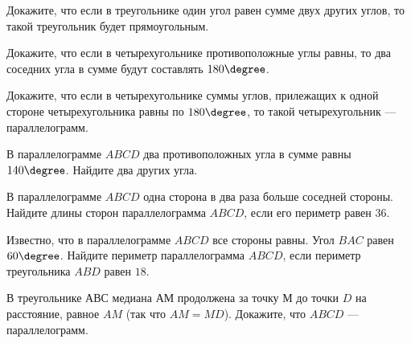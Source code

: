 \begin{class}[number=6]
	\begin{listofex}
		\item Докажите, что если в треугольнике один угол равен сумме двух других углов, то такой треугольник будет прямоугольным.
		\item Докажите, что если в четырехугольнике противоположные углы равны, то два соседних угла в сумме будут составлять \( 180\degree \).
		\item Докажите, что если в четырехугольнике суммы углов, прилежащих к одной стороне четырехугольника равны по \( 180\degree \), то такой четырехугольник --- параллелограмм.
		\item В параллелограмме \( ABCD \) два противоположных угла в сумме равны \( 140\degree \). Найдите два других угла.
		\item В параллелограмме \( ABCD \) одна сторона в два раза больше соседней стороны. Найдите длины сторон параллелограмма \( ABCD \), если его периметр равен \( 36 \).
		\item Известно, что в параллелограмме \( ABCD \) все стороны равны. Угол \( BAC \) равен \( 60\degree \). Найдите периметр параллелограмма \( ABCD \), если периметр треугольника \( ABD \) равен \( 18 \).
		\item В треугольнике \( АВС \) медиана \( АМ \) продолжена за точку \( М \) до точки \( D \) на расстояние, равное \( AM \) (так что \( AM=MD\)). Докажите, что \( ABCD \) --- параллелограмм.
	\end{listofex}
\end{class}
%
%
%	
%
%
